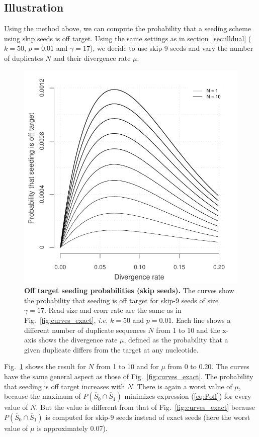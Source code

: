 \documentclass{article}
\begin{document}
\subsection{Illustration}
\label{sec:illskipdual}

Using the method above, we can compute the probability that a seeding
scheme using skip seeds is off target. Using the same settings as in
section~\ref{sec:illdual} ($k=50$, $p=0.01$ and $\gamma=17$), we decide to
use skip-9 seeds and vary the number of duplicates $N$ and their
divergence rate $\mu$.

\begin{figure}[h]
\centering
\includegraphics[scale=0.65]{curves_skip.pdf}
\caption{\textbf{Off target seeding probabilities (skip seeds).}
The curves show the probability that seeding is off target for skip-9
seeds of size $\gamma=17$. Read size and erorr rate are the same as in
Fig.~\ref{fig:curves_exact}, \textit{i.e.} $k=50$ and $p=0.01$. Each line
shows a different number of duplicate sequences $N$ from 1 to 10 and the
x-axis shows the divergence rate $\mu$, defined as the probability that a
given duplicate differs from the target at any nucleotide.}
\label{fig:curves_skip}
\end{figure}

Fig.~\ref{fig:curves_skip} shows the result for $N$ from 1 to 10 and for
$\mu$ from 0 to 0.20. The curves have the same general aspect as those of
Fig.~\ref{fig:curves_exact}. The probability that seeding is off target
increases with $N$. There is again a  worst value of $\mu$, because the
maximum of $P(\overline{S}_0 \cap \overline{S}_1)$ minimizes expression
(\ref{eq:Poff}) for every value of $N$. But the value is different from
that of Fig.~\ref{fig:curves_exact} because $P(\overline{S}_0 \cap
\overline{S}_1)$ is computed for skip-9 seeds instead of exact seeds (here
the worst value of $\mu$ is approximately 0.07).
\end{document}
